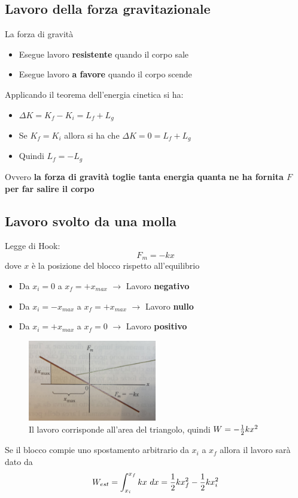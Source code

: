 \documentclass[12pt]{article}
\begin{document}
    \subsection{Lavoro della forza gravitazionale}
    La forza di gravità 
    \begin{itemize}
        \item Esegue lavoro \textbf{resistente} quando il corpo sale
        \item Esegue lavoro \textbf{a favore} quando il corpo scende
    \end{itemize}
    Applicando il teorema dell'energia cinetica si ha:
    \begin{itemize}
        \item $\Delta K = K_f - K_i = L_f + L_g$
        \item Se $K_f = K_i$ allora si ha che $\Delta K = 0 = L_f + L_g$
        \item Quindi $L_f = -L_g$
    \end{itemize}
    Ovvero \textbf{la forza di gravità toglie tanta energia quanta ne ha fornita $F$ per far salire il corpo}
    \newpage
    \subsection{Lavoro svolto da una molla} Legge di Hook:
    $$F_m = -kx$$
    dove $x$ è la posizione del blocco rispetto all'equilibrio
    \begin{itemize}
        \item Da $x_i =  0$ a $x_f = +x_{max}$ $\rightarrow$ Lavoro \textbf{negativo} 
        \item Da $x_i = -x_{max}$ a $x_f = +x_{max}$ $\rightarrow$ Lavoro \textbf{nullo} 
        \item Da $x_i = +x_{max} $ a $x_f = 0$ $\rightarrow$ Lavoro \textbf{positivo} 
    \end{itemize}
    \begin{figure}[!htb]
        \centering
        \includegraphics[width=0.5\textwidth]{IMG_2434.jpg}
        \caption{Il lavoro corrisponde all'area del triangolo, quindi $W=-{1 \over 2}kx^2$}
    \end{figure}
    \FloatBarrier
    Se il blocco compie uno spostamento arbitrario da $x_i$ a $x_f$ allora il lavoro sarà dato da
    $$W_{est} = \int_{x_i}^{x_f} kx \ dx = {1 \over 2} kx_f^2 - {1 \over 2} kx_i^2$$
    \newpage
\end{document}
